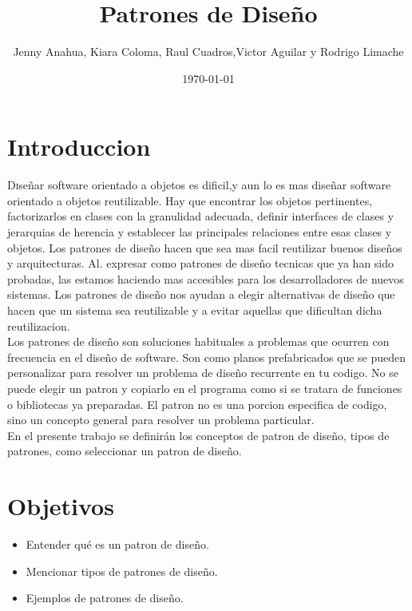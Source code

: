 \documentclass[twoside,twocolumn]{article}
\title{Patrones de Diseño} %
\author{Jenny Anahua, Kiara Coloma, Raul Cuadros,Victor Aguilar y Rodrigo Limache}
\date{\today} %
\begin{document}
\maketitle
\section{Introduccion}

\lettrine[nindent=0em,lines=3]{D}iseñar software orientado a objetos es dificil,y aun lo es mas diseñar software orientado a objetos reutilizable. Hay que encontrar los objetos pertinentes, factorizarlos en clases con la granulidad adecuada, definir interfaces de clases y jerarquias de herencia y establecer las principales relaciones entre esas clases y objetos. Los patrones de diseño hacen que sea mas facil reutilizar  buenos diseños y arquitecturas. Al. expresar como patrones de diseño tecnicas que ya han sido probadas, las estamos haciendo mas accesibles para los desarrolladores de nuevos sistemas. Los patrones de diseño nos ayudan a elegir alternativas de diseño que hacen que un sistema sea reutilizable y a evitar aquellas que dificultan dicha reutilizacion.\\
Los patrones de diseño son soluciones habituales a problemas que ocurren con frecuencia en el diseño de software. Son como planos prefabricados que se pueden personalizar para resolver un problema de diseño recurrente en tu codigo. No se puede elegir un patron y copiarlo en el programa como si se tratara de funciones o  bibliotecas ya preparadas. El patron no es una porcion especifica de codigo, sino un concepto general para resolver un problema particular. \\
En el presente trabajo se definirán los conceptos de patron de diseño, tipos de patrones, como seleccionar un patron de diseño.
\section{Objetivos}

\begin{itemize}
\item Entender qué es un patron de diseño.
\item Mencionar tipos de patrones de diseño.
\item Ejemplos de patrones de diseño.
\end{itemize}
\end{document}
